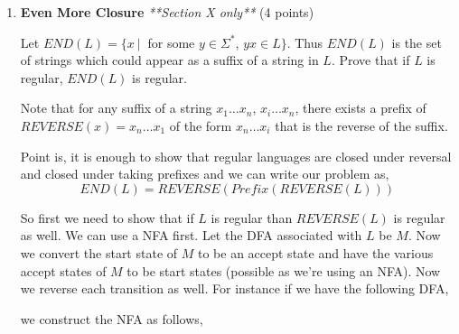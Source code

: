 \documentclass[11pt]{article}
\begin{document}
\begin{enumerate}
\begin{answer}
    \end{answer}
    
    \item \textbf{Even More Closure} \textit{**Section X only**} (4 points)
    
    Let $END(L) = \{x\ |\ $ for some $y \in \Sigma^*$, $yx \in L\}$. Thus $END(L)$ is the set of strings which could appear as a suffix of a string in $L$. Prove that if $L$ is regular, $END(L)$ is regular.

    \begin{answer}
        Note that for any suffix of a string $x_{1}\dots x_n$, $x_i \dots x_n$, there exists a prefix of $REVERSE(x) = x_n \dots x_1$ of the form $x_n \dots x_i$ that is the reverse of the suffix.

        \vspace{1em}

        Point is, it is enough to show that regular languages are closed under reversal and closed under taking prefixes and we can write our problem as,
        \[
            END(L) = REVERSE(Prefix(REVERSE(L)))
        \]

        So first we need to show that if $L$ is regular than $REVERSE(L)$ is regular  as well. We can use a NFA first. Let the DFA associated with $L$ be $M$. Now we convert the start state of $M$ to be an accept state and have the various accept states of $M$ to be start states (possible as we're using an NFA). Now we reverse each transition as well. For instance if we have the following DFA,
        \begin{center}
        \end{center}

        we construct the NFA as follows,


\end{answer}
\end{enumerate}
\end{document}
